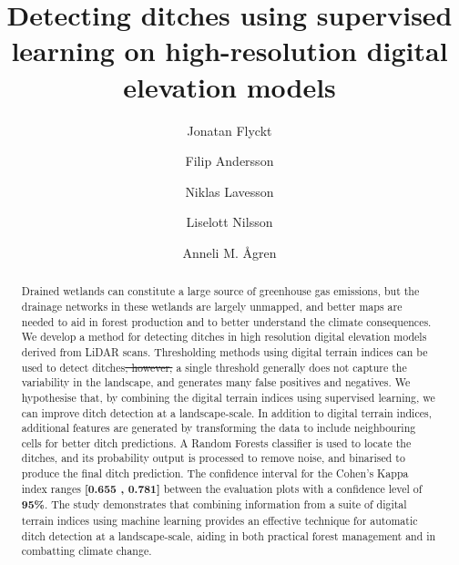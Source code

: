 \documentclass[11pt, review]{elsarticle} %
\providecommand{\DIFaddtex}[1]{{\protect\color{blue}\uwave{#1}}} %
\providecommand{\DIFdeltex}[1]{{\protect\color{red}\sout{#1}}}                      %
\providecommand{\DIFaddbegin}{} %
\providecommand{\DIFaddend}{} %
\providecommand{\DIFdelbegin}{} %
\providecommand{\DIFdelend}{} %
\providecommand{\DIFadd}[1]{\texorpdfstring{\DIFaddtex{#1}}{#1}} %
\providecommand{\DIFdel}[1]{\texorpdfstring{\DIFdeltex{#1}}{}} %
\begin{document}
\begin{frontmatter}
\title{Detecting ditches using supervised learning on high-resolution digital elevation models}

\author[ju]{Jonatan Flyckt}

\author[ju]{Filip Andersson}

\author[ju]{Niklas Lavesson}

\author[fa]{Liselott Nilsson}

\author[slu]{Anneli M. \AA gren}

\address[ju]{Department of Computer Science, School of Engineering, J\"onk\"oping University, Gjuterigatan 5, 553 18, J\"onk\"oping, Sweden}
\address[fa]{Forest Department, Swedish Forest Agency, Skeppargatan 17, 931 32 Skellefte\aa, Sweden}
\address[slu]{Department of Forest Ecology and Management, Swedish University of Agricultural Sciences, SLU, Skogsmarksgr\"and 17, 901 83, Ume\aa, Sweden}

\begin{abstract}
{\footnotesize
Drained wetlands can constitute a large source of greenhouse gas emissions, but the drainage networks in these wetlands are largely unmapped, and better maps are needed to aid in forest production and to better understand the climate consequences. We develop a method for detecting ditches in high resolution digital elevation models derived from LiDAR scans. Thresholding methods using digital terrain indices can be used to detect ditches\DIFdelbegin \DIFdel{, however, }\DIFdelend \DIFaddbegin \DIFadd{. However, }\DIFaddend a single threshold generally does not capture the variability in the landscape, and generates many false positives and negatives. We hypothesise that, by combining the digital terrain indices using supervised learning, we can improve ditch detection at a landscape-scale. In addition to digital terrain indices, additional features are generated by transforming the data to include neighbouring cells for better ditch predictions. A Random Forests classifier is used to locate the ditches, and its probability output is processed to remove noise, and binarised to produce the final ditch prediction. The confidence interval for the Cohen's Kappa index ranges \textbf{[0.655 , 0.781]} between the evaluation plots with a confidence level of \textbf{95\%}. The study demonstrates that combining information from  a suite of digital terrain indices using machine learning provides an effective technique for automatic ditch detection at a landscape-scale, aiding in both practical forest management and in combatting climate change.}
\end{abstract}


\end{frontmatter}
\end{document}
